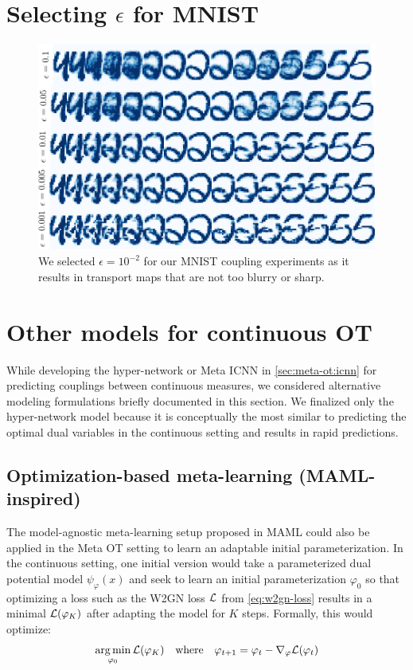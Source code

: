 \documentclass{article}
\begin{document}
{\small


}

\appendix
\section{Selecting $\epsilon$ for MNIST}
\label{app:mnist-eps}
\begin{figure}[h]
  \centering
  \includegraphics[width=\textwidth]{fig/mnist-epsilons.pdf}
  \caption{We selected $\epsilon=10^{-2}$ for our MNIST coupling
    experiments as it results in transport maps that are not
    too blurry or sharp.}
  \label{fig:mnist-epsilon}
\end{figure}

\section{Other models for continuous OT}
\label{app:other-W2-models}
While developing the hyper-network or Meta ICNN in \cref{sec:meta-ot:icnn}
for predicting couplings between continuous measures, we considered
alternative modeling formulations briefly documented in this section.
We finalized only the hyper-network model because it is conceptually the
most similar to predicting the optimal dual variables in the continuous setting
and results in rapid predictions.

\subsection{Optimization-based meta-learning (MAML-inspired)}
The model-agnostic meta-learning setup proposed in MAML \citep{pmlr-v70-finn17a}
could also be applied in the Meta OT setting to learn an adaptable
initial parameterization.
In the continuous setting, one initial version would take a parameterized
dual potential model $\psi_\varphi(x)$ and seek to learn an initial
parameterization $\varphi_0$ so that optimizing a loss such as the
W2GN loss ${\mathcal{L}}$ from \cref{eq:w2gn-loss} results in a minimal
${\mathcal{L}}(\varphi_K)$ after adapting the model for $K$ steps.
Formally, this would optimize:
\begin{equation}
  \operatorname*{arg\,min}_{\varphi_0} {\mathcal{L}}(\varphi_K)\quad \text{where}\quad \varphi_{t+1}=\varphi_t-\nabla_\varphi{\mathcal{L}}(\varphi_t)
  \label{eq:maml-meta-ot}
\end{equation}
\end{document}

